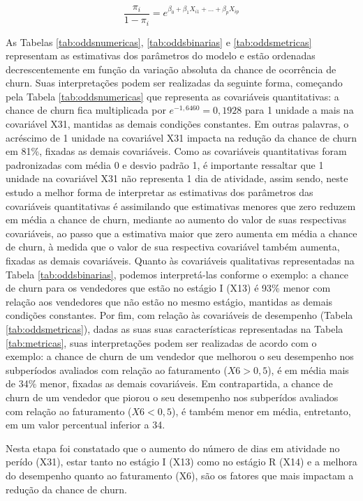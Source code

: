 \documentclass[twocolumn]{rbef}
\newcommand{\1}{\mathbbm{1}}
\begin{document}
\begin{equation}
\dfrac{\pi_i}{1-\pi_i}= e^{\beta_0 + \beta_1 X_{i1} + ... +  \beta_p X_{ip}}\label{eq:odds}
\end{equation}

As Tabelas \ref{tab:oddsnumericas}, \ref{tab:oddsbinarias} e \ref{tab:oddsmetricas} representam as estimativas dos parâmetros do modelo e estão ordenadas decrescentemente em função da variação absoluta da chance de ocorrência de churn. Suas interpretações podem ser realizadas da seguinte forma, começando pela Tabela \ref{tab:oddsnumericas} que representa as covariáveis quantitativas: a chance de churn fica multiplicada por \(e^{-1,6460}=0,1928\) para 1 unidade a mais na covariável X31, mantidas as demais condições constantes. Em outras palavras, o acréscimo de 1 unidade na covariável X31 impacta na redução da chance de churn em 81\%, fixadas as demais covariáveis. Como as covariáveis quantitativas foram padronizadas com média 0 e desvio padrão 1, é importante ressaltar que 1 unidade na covariável X31 não representa 1 dia de atividade, assim sendo, neste estudo a melhor forma de interpretar as estimativas dos parâmetros das covariáveis quantitativas é assimilando que estimativas menores que zero reduzem em média a chance de churn, mediante ao aumento do valor de suas respectivas covariáveis, ao passo que a estimativa maior que zero aumenta em média a chance de churn, à medida que o valor de sua respectiva covariável também aumenta, fixadas as demais covariáveis. Quanto às covariáveis qualitativas representadas na Tabela \ref{tab:oddsbinarias}, podemos interpretá-las conforme o exemplo: a chance de churn para os vendedores que estão no estágio I (X13) é 93\% menor com relação aos vendedores que não estão no mesmo estágio, mantidas as demais condições constantes. Por fim, com relação às covariáveis de desempenho (Tabela \ref{tab:oddsmetricas}), dadas as suas suas características representadas na Tabela \ref{tab:metricas}, suas interpretações podem ser realizadas de acordo com o exemplo: a chance de churn de um vendedor que melhorou o seu desempenho nos subperíodos avaliados com relação ao faturamento (\(X6>0,5\)), é em média mais de 34\% menor, fixadas as demais covariáveis. Em contrapartida, a chance de churn de um vendedor que piorou o seu desempenho nos subperídos avaliados com relação ao faturamento (\(X6<0,5\)), é também menor em média, entretanto, em um valor percentual inferior a 34.

Nesta etapa foi constatado que o aumento do número de dias em atividade no perído (X31), estar tanto no estágio I (X13) como no estágio R (X14) e a melhora do desempenho quanto ao faturamento (X6), são os fatores que mais impactam a redução da chance de churn.
\end{document}
